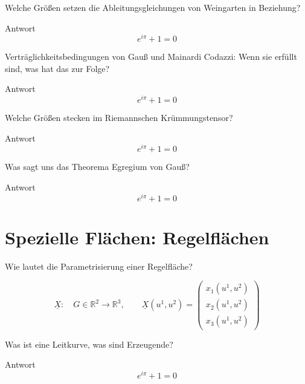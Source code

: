 \documentclass[twocolumn, fontsize=8pt, DIV=1]{scrartcl}
\begin{document}
\begin{framed}
    Welche Größen setzen die Ableitungsgleichungen von Weingarten in Beziehung?
\end{framed}
Antwort
\[
    e^{i\pi} + 1 = 0
\]



\begin{framed}
    Verträglichkeitsbedingungen von Gauß und Mainardi Codazzi: Wenn sie erfüllt sind, was hat das zur Folge?
\end{framed}
Antwort
\[
    e^{i\pi} + 1 = 0
\]



\begin{framed}
    Welche Größen stecken im Riemannschen Krümmungstensor?
\end{framed}
Antwort
\[
    e^{i\pi} + 1 = 0
\]



\begin{framed}
    Was sagt uns das Theorema Egregium von Gauß?
\end{framed}
Antwort
\[
    e^{i\pi} + 1 = 0
\]











\section{Spezielle Flächen: Regelflächen}



\begin{framed}
    Wie lautet die Parametrisierung einer Regelfläche?
\end{framed}
\[
\underline{X}: \quad G \in \mathbb{R}^2 \to \mathbb{R}^3, \qquad 
\underline{X}(u^1, u^2) =
 \left(
 \begin{array}{c}
 x_1(u^1, u^2)\\
 x_2(u^1, u^2)\\
 x_3(u^1, u^2)
 \end{array}
\right) 
\]



\begin{framed}
    Was ist eine Leitkurve, was sind Erzeugende?
\end{framed}
Antwort
\[
    e^{i\pi} + 1 = 0
\]
\end{document}
